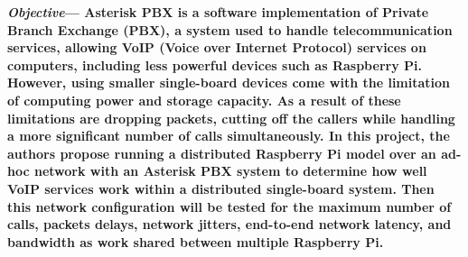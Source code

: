 {
	\bfseries\textit{Objective}---
	Asterisk PBX is a software implementation of Private Branch Exchange (PBX), a system used to handle telecommunication services, allowing VoIP (Voice over Internet Protocol) services on computers, including less powerful devices such as Raspberry Pi. However, using smaller single-board devices come with the limitation of computing power and storage capacity. As a result of these limitations are dropping packets, cutting off the callers while handling a more significant number of calls simultaneously. In this project, the authors propose running a distributed Raspberry Pi model over an ad-hoc network with an Asterisk PBX system to determine how well VoIP services work within a distributed single-board system. Then this network configuration will be tested for the maximum number of calls, packets delays, network jitters, end-to-end network latency, and bandwidth as work shared between multiple Raspberry Pi.
}